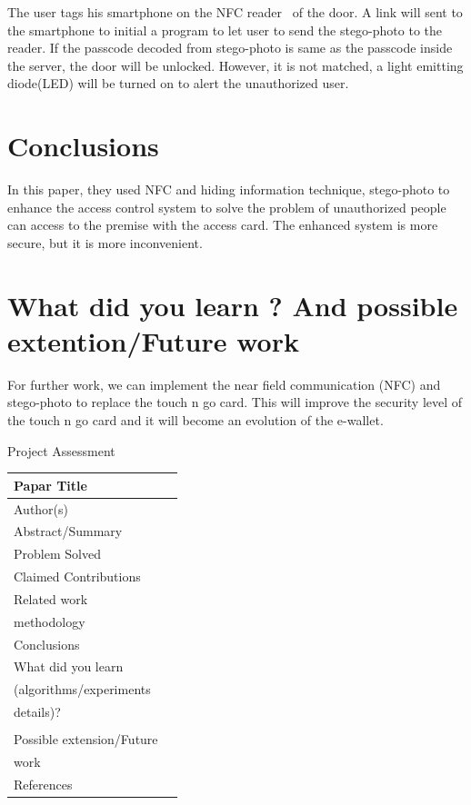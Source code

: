 \documentclass[a4paper, 12pt]{article}
\begin{document}
The user tags his smartphone on the NFC reader~\cite{Madlmayr4529403} of the door. A link will sent to the smartphone to initial a program to let user to send the stego-photo to the reader.
If the passcode decoded from stego-photo is same as the passcode inside the server, the door will be unlocked. However, it is not matched, a light emitting diode(LED) will be turned on to alert the unauthorized user.

\section{Conclusions}
\hspace{1cm}In this paper, they used NFC and hiding information technique, stego-photo to enhance the access control system to solve the problem of unauthorized people can access to the premise with the access card. The enhanced system is more secure, but it is more inconvenient. 

\section{What did you learn ? And  possible extention/Future work}
\hspace{1cm}For further work, we can implement the near field communication (NFC) and stego-photo to replace the touch n go card. This will improve the security level of the touch n go card and it will become an evolution of the e-wallet.

\newpage
{}
\newpage

\large{Project Assessment}\\

\begin{tabular}{|l|l|}
\hline
Papar Title & \hspace{8cm}  \\
\hline
Author(s) &   \\
\hline
Abstract/Summary &  \\
\hline
Problem Solved &   \\
\hline
Claimed Contributions &  \\
\hline
Related work &   \\
\hline
methodology & \\
\hline
Conclusions  &   \\
\hline
What did you learn & \\
(algorithms/experiments & \\
details)? & \\
 & \\
Possible extension/Future & \\
work & \\
\hline
References &\\
\hline
\end{tabular}
\end{document}
